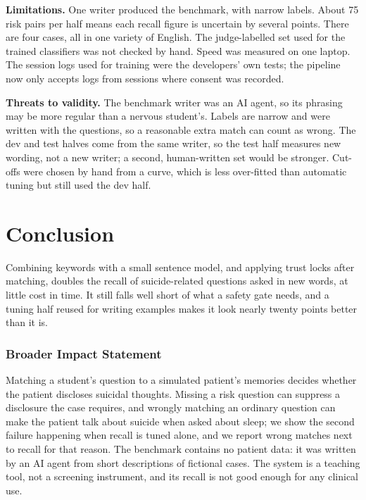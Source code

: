 \documentclass[10pt]{article}
\begin{document}
\textbf{Limitations.} One writer produced the benchmark, with narrow labels. About 75 risk pairs per half means each recall figure is uncertain by
several points. There are four cases, all in one variety of English. The judge-labelled set used for the trained classifiers was not checked by
hand. Speed was measured on one laptop. The session logs used for training were the developers' own tests; the pipeline now only accepts logs from
sessions where consent was recorded.

\textbf{Threats to validity.} The benchmark writer was an AI agent, so its phrasing may be more regular than a nervous student's. Labels are
narrow and were written with the questions, so a reasonable extra match can count as wrong. The dev and test halves come from the same writer,
so the test half measures new wording, not a new writer; a second, human-written set would be stronger. Cut-offs were chosen by hand from a
curve, which is less over-fitted than automatic tuning but still used the dev half.

\section{Conclusion}
Combining keywords with a small sentence model, and applying trust locks after matching, doubles the recall of suicide-related questions asked in
new words, at little cost in time. It still falls well short of what a safety gate needs, and a tuning half reused for writing examples makes it
look nearly twenty points better than it is.

\subsubsection*{Broader Impact Statement}
Matching a student's question to a simulated patient's memories decides whether the patient discloses suicidal thoughts. Missing a risk question can suppress a disclosure the case requires, and wrongly matching an ordinary question can make the patient talk about suicide when asked about sleep; we show the second failure happening when recall is tuned alone, and we report wrong matches next to recall for that reason. The benchmark contains no patient data: it was written by an AI agent from short descriptions of fictional cases. The system is a teaching tool, not a screening instrument, and its recall is not good enough for any clinical use.
\end{document}
